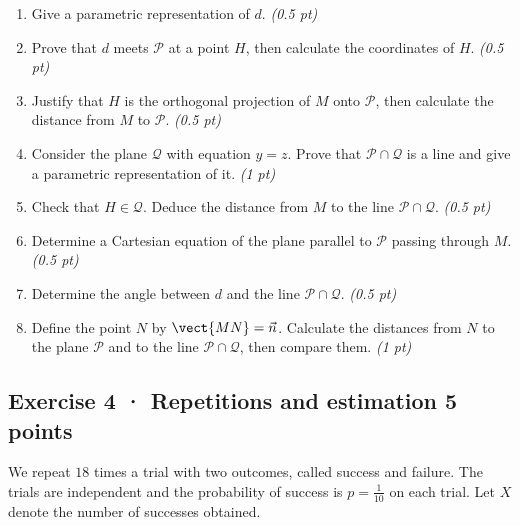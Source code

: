 \begin{enumerate}

\item Give a parametric representation of $d$. \hfill\textit{(0.5 pt)}

\item Prove that $d$ meets $\mathcal P$ at a point $H$, then calculate the coordinates of $H$. \hfill\textit{(0.5 pt)}

\item Justify that $H$ is the orthogonal projection of $M$ onto $\mathcal P$, then calculate the distance from $M$ to $\mathcal P$. \hfill\textit{(0.5 pt)}

\item Consider the plane $\mathcal Q$ with equation $y=z$. Prove that $\mathcal P\cap\mathcal Q$ is a line and give a parametric representation of it. \hfill\textit{(1 pt)}

\item Check that $H\in\mathcal Q$. Deduce the distance from $M$ to the line $\mathcal P\cap\mathcal Q$. \hfill\textit{(0.5 pt)}

\item Determine a Cartesian equation of the plane parallel to $\mathcal P$ passing through $M$. \hfill\textit{(0.5 pt)}

\item Determine the angle between $d$ and the line $\mathcal P\cap\mathcal Q$. \hfill\textit{(0.5 pt)}

\item Define the point $N$ by $\vect{MN}=\vec n$. Calculate the distances from $N$ to the plane $\mathcal P$ and to the line $\mathcal P\cap\mathcal Q$, then compare them. \hfill\textit{(1 pt)}

\end{enumerate}

\subsection*{Exercise 4 · Repetitions and estimation \hfill 5 points}We repeat $18$ times a trial with two outcomes, called success and failure. The trials are independent and the probability of success is $p=\frac{1}{10}$ on each trial. Let $X$ denote the number of successes obtained.

